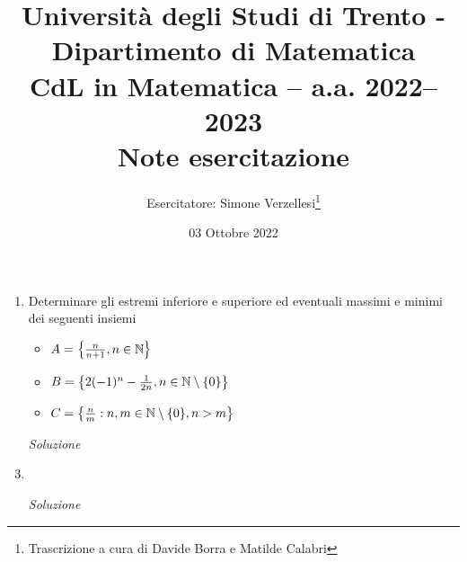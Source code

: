 \documentclass{article}
\title{Università degli Studi di Trento - Dipartimento di Matematica\\
CdL in Matematica – a.a. 2022–2023\\ Note esercitazione}
\author{Esercitatore: Simone Verzellesi\thanks{Trascrizione a cura di Davide Borra e Matilde Calabri}}
\date{03 Ottobre 2022}
\begin{document}
\maketitle
{}
\begin{enumerate}[label=\textbf{Esercizio 3.\arabic*.},itemindent=*]
    \item Determinare gli estremi inferiore e superiore ed eventuali massimi e minimi dei seguenti insiemi 
    \begin{itemize}
        \item $A=\left\{\frac{n}{n+1},n\in \mathbb{N}\right\}$
        \item $B=\left\{2(-1)^n-\frac{1}{2n}, n\in \mathbb{N}\setminus \{0\}\right\}$
        \item $C=\left\{\frac{n}{m}: n, m\in \mathbb{N}\setminus\{0\},n>m\right\}$
    \end{itemize}
    \item[\textit{\large Soluzione~}]
    
    \item 
    \item[\textit{\large Soluzione~}]
\end{enumerate}
\end{document}
